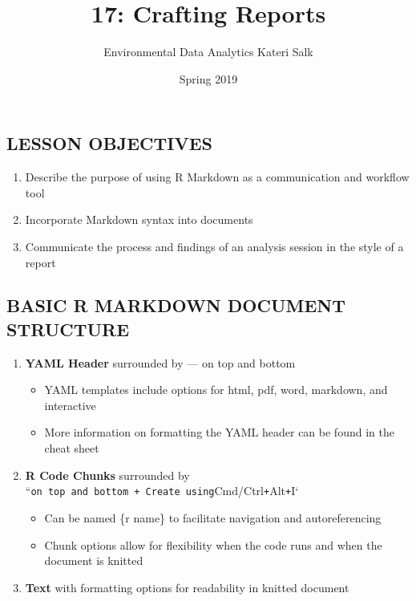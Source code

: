 \documentclass[]{article}
\title{17: Crafting Reports}
\author{Environmental Data Analytics \textbar{} Kateri Salk}
\date{Spring 2019}
\providecommand{\tightlist}{%
  \setlength{\itemsep}{0pt}\setlength{\parskip}{0pt}}
\begin{document}
\maketitle

\subsection{LESSON OBJECTIVES}\label{lesson-objectives}

\begin{enumerate}
\def\labelenumi{\arabic{enumi}.}
\tightlist
\item
  Describe the purpose of using R Markdown as a communication and
  workflow tool
\item
  Incorporate Markdown syntax into documents
\item
  Communicate the process and findings of an analysis session in the
  style of a report
\end{enumerate}

\subsection{BASIC R MARKDOWN DOCUMENT
STRUCTURE}\label{basic-r-markdown-document-structure}

\begin{enumerate}
\def\labelenumi{\arabic{enumi}.}
\tightlist
\item
  \textbf{YAML Header} surrounded by --- on top and bottom

  \begin{itemize}
  \tightlist
  \item
    YAML templates include options for html, pdf, word, markdown, and
    interactive
  \item
    More information on formatting the YAML header can be found in the
    cheat sheet
  \end{itemize}
\item
  \textbf{R Code Chunks} surrounded by
  ``\texttt{on\ top\ and\ bottom\ +\ Create\ using}Cmd/Ctrl\texttt{+}Alt\texttt{+}I`

  \begin{itemize}
  \tightlist
  \item
    Can be named \{r name\} to facilitate navigation and autoreferencing
  \item
    Chunk options allow for flexibility when the code runs and when the
    document is knitted
  \end{itemize}
\item
  \textbf{Text} with formatting options for readability in knitted
  document
\end{enumerate}
\end{document}
